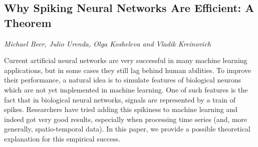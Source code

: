 \documentclass[../booklet.tex]{subfiles}
\begin{document}
\subsection[Why Spiking Neural Networks Are Efficient: A Theorem. {\it Michael Beer, Julio Urenda, Olga Kosheleva and Vladik Kreinovich}]{Why Spiking Neural Networks Are Efficient: A Theorem}
   

\begin{center}
  {\it Michael Beer, Julio Urenda, Olga Kosheleva and Vladik Kreinovich}
\end{center}



Current artificial neural networks are very successful in many
machine learning applications, but in some cases they still lag
behind human abilities. To improve their performance, a natural
idea is to simulate features of biological neurons which are not
yet implemented in machine learning. One of such features is the
fact that in biological neural networks, signals are represented by
a train of spikes. Researchers have tried adding this spikiness to
machine learning and indeed got very good results, especially when
processing time series (and, more generally, spatio-temporal data).
In this paper, we provide a possible theoretical explanation for this
empirical success.

\end{document}

